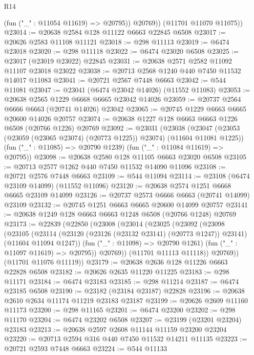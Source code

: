 \begin{lexlean}{R14}
\begin{coremodule}
{{{{{{{{{{{{{{{{{{{{{{{{{{{{{{{{{{{{{{{{{{{{{{{{{{{{{{{{{{{{{{{{{{{{{{{{{{{{{{{{{{            (fun ("_" : @11054 @11619) => @20795))
          @20769))
      (@11701 @11070 @11075))
@23014 := @20638 @2584 @128 @11122 @6663 @22845 @6508
@23017 := @20626 @2583 @11108 @11121
@23018 := @298 @11113
@23019 := @6474 @23018
@23020 := @298 @11118
@23022 := @6474 @23020 @6508
@23025 := @23017 (@23019 @23022) @22845
@23031 := @20638 @2571 @2582 @11092 @11107 @23018 @23022
@23038 := @20713 @2568 @1240 @440 @7450 @11532 @14017 @11083
@23041 := @20721 @2567 @7448 @6663
@23042 := @544 @11081
@23047 := @23041 (@6474 @23042 @14026) (@11552 @11083)
@23053 := @20638 @2565 @1229 @6668 @6665 @23042 @14026
@23059 := @20737 @2564 @6666 @6663 (@20741 @14026) @23042
@23065 := @20745 @1229 @6663 @6665 @20600 @14026 @20757
@23074 := @20638 @1227 @128 @6663 @6663 @1226 @6508 (@20766 @1226) @20769
@23092 := @23031
    (@23038
      (@23047 (@23053 (@23059 (@23065 @23074) (@20773 @1225)) @23074) (@11604 @11081 @1225))
      (fun ("_" : @11085) => @20790 @1239)
      (fun ("_" : @11084 @11619) => @20795))
@23098 := @20638 @2580 @128 @11105 @6663 @23020 @6508
@23105 := @20713 @2577 @1262 @440 @7450 @11532 @14090 @11096
@23108 := @20721 @2576 @7448 @6663
@23109 := @544 @11094
@23114 := @23108 (@6474 @23109 @14099) (@11552 @11096)
@23120 := @20638 @2574 @1251 @6668 @6665 @23109 @14099
@23126 := @20737 @2573 @6666 @6663 (@20741 @14099) @23109
@23132 := @20745 @1251 @6663 @6665 @20600 @14099 @20757
@23141 := @20638 @1249 @128 @6663 @6663 @1248 @6508 (@20766 @1248) @20769
@23173 := @22839
    (@22850
      (@23008
        (@23014
          (@23025
            (@23092
              (@23098
                (@23105
                  (@23114
                    (@23120 (@23126 (@23132 @23141) (@20773 @1247)) @23141)
                    (@11604 @11094 @1247))
                  (fun ("_" : @11098) => @20790 @1261)
                  (fun ("_" : @11097 @11619) => @20795))
                @20769))
            (@11701 @11113 @11118))
          @20769))
      (@11701 @11076 @11119))
@23179 := @20638 @2636 @128 @11226 @6663 @22828 @6508
@23182 := @20626 @2635 @11220 @11225
@23183 := @298 @11171
@23184 := @6474 @23183
@23185 := @298 @11214
@23187 := @6474 @23185 @6508
@23190 := @23182 (@23184 @23187) @22828
@23196 := @20638 @2610 @2634 @11174 @11219 @23183 @23187
@23199 := @20626 @2609 @11160 @11173
@23200 := @298 @11165
@23201 := @6474 @23200
@23202 := @298 @11170
@23204 := @6474 @23202 @6508
@23207 := @23199 (@23201 @23204) @23183
@23213 := @20638 @2597 @2608 @11144 @11159 @23200 @23204
@23220 := @20713 @2594 @316 @440 @7450 @11532 @14211 @11135
@23223 := @20721 @2593 @7448 @6663
@23224 := @544 @11133
}}}}}}}}}}}}}}}}}}}}}}}}}}}}}}}}}}}}}}}}}}}}}}}}}}}}}}}}}}}}}}}}}}}}}}}}}}}}}}}}}}
\end{coremodule}
\end{lexlean}

